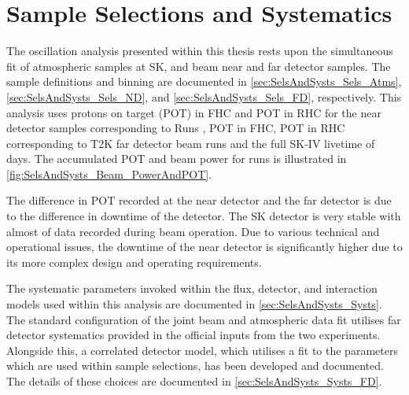 \chapter{Sample Selections and Systematics}
\label{chap:SelsAndSysts}

The oscillation analysis presented within this thesis rests upon the simultaneous fit of atmospheric samples at SK, and beam near and far detector samples. The sample definitions and binning are documented in \autoref{sec:SelsAndSysts_Sels_Atms}, \autoref{sec:SelsAndSysts_Sels_ND}, and \autoref{sec:SelsAndSysts_Sels_FD}, respectively. This analysis uses  protons on target (POT) in FHC and  POT in RHC for the near detector samples corresponding to Runs ,  POT in FHC,  POT in RHC corresponding to T2K far detector beam runs  and the full SK-IV livetime of  days. The accumulated POT and beam power for runs  is illustrated in \autoref{fig:SelsAndSysts_Beam_PowerAndPOT}.

The difference in POT recorded at the near detector and the far detector is due to the difference in downtime of the detector. The SK detector is very stable with almost  of data recorded during beam operation. Due to various technical and operational issues, the downtime of the near detector is significantly higher due to its more complex design and operating requirements.

The systematic parameters invoked within the flux, detector, and interaction models used within this analysis are documented in \autoref{sec:SelsAndSysts_Systs}. The standard configuration of the joint beam and atmospheric data fit utilises far detector systematics provided in the official inputs from the two experiments. Alongside this, a correlated detector model, which utilises a fit to the parameters which are used within sample selections, has been developed and documented. The details of these choices are documented in \autoref{sec:SelsAndSysts_Systs_FD}.

